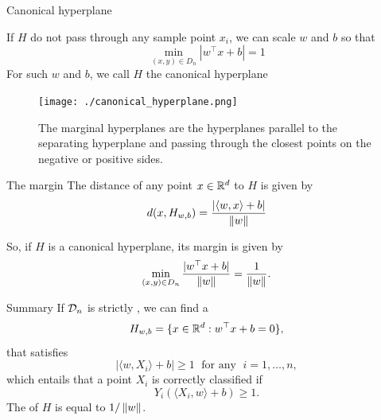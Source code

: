 \documentclass[xcolor={usenames,dvipsnames}]{beamer}
\begin{document}
\begin{frame}{Canonical hyperplane}

  If $H$ do not pass through any sample point $x_i$, we can scale $w$ and $b$ so that
  \begin{equation*}
    \min_{(x, y) \in D_n} |w^\top x + b| = 1
  \end{equation*}
    For such $w$ and $b$, we call $H$ the {\color{Vert}canonical} hyperplane
    
    
  \begin{figure}
  \begin{center}
    \texttt{[image: ./canonical\_hyperplane.png]}
    \caption{The marginal hyperplanes are the hyperplanes parallel to the separating hyperplane and passing through the closest points on the negative or positive sides.}
  \end{center}
  \end{figure}


\end{frame}


\begin{frame}{The margin}
  The distance of any point $x \in \mathbb{R}^d$ to $H$ is given by
  \begin{equation*}
    d(x,H_{w,b}) = \frac{|\langle {w, x} \rangle  + b|}{\left\| w \right\|}
  \end{equation*}

\begin{exampleblock}{}
  So, if $H$ is a canonical hyperplane, its {\color{Vert}margin} is given by
  \begin{equation*}
    \min_{(x, y) \in D_n}   \frac{|w^\top x + b|}{\left\| w \right\|} 
    = \frac{1}{\left\| w \right\|}.
  \end{equation*}
 \end{exampleblock}


\end{frame}



\begin{frame}{Summary}
If ${\mathcal{D}}_n$ is strictly , we can find a  
\begin{equation*}
  H_{w,b} = \{ x \in \mathbb{R}^d : w^\top x + b = 0 \},
\end{equation*}
that satisfies
\begin{equation*}
  |\langle {w, X_i} \rangle  + b| \geq 1 \; \text{ for any } \; i=1, \ldots, n,
\end{equation*}
which entails that a point $X_i$ is correctly classified if
\begin{equation*}
  Y_i (\langle {X_i, w} \rangle  + b) \geq 1.
\end{equation*}
The  of $H$ is equal to $1 / \left\| w \right\|$.
\end{frame}
\end{document}
